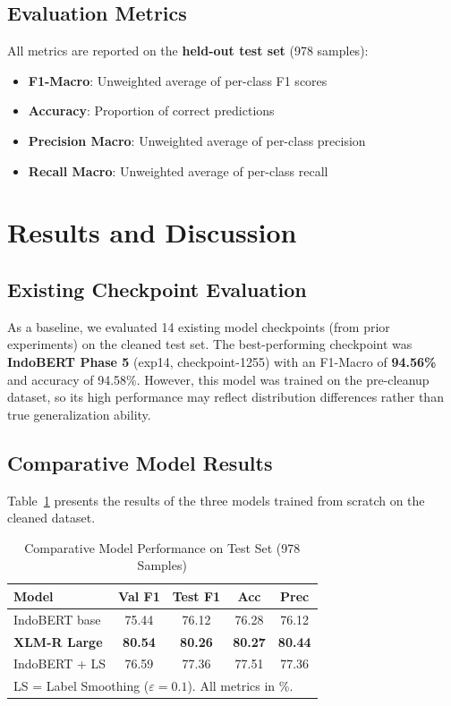 \documentclass[10pt,twocolumn]{article}
\begin{document}
\subsection{Evaluation Metrics}

All metrics are reported on the \textbf{held-out test set} (978 samples):
\begin{itemize}[leftmargin=*,nosep]
    \item \textbf{F1-Macro}: Unweighted average of per-class F1 scores
    \item \textbf{Accuracy}: Proportion of correct predictions
    \item \textbf{Precision Macro}: Unweighted average of per-class precision
    \item \textbf{Recall Macro}: Unweighted average of per-class recall
\end{itemize}

\section{Results and Discussion}

\subsection{Existing Checkpoint Evaluation}

As a baseline, we evaluated 14 existing model checkpoints (from prior experiments) on the cleaned test set. The best-performing checkpoint was \textbf{IndoBERT Phase 5} (exp14, checkpoint-1255) with an F1-Macro of \textbf{94.56\%} and accuracy of 94.58\%. However, this model was trained on the pre-cleanup dataset, so its high performance may reflect distribution differences rather than true generalization ability.

\subsection{Comparative Model Results}

Table~\ref{tab:model_comparison} presents the results of the three models trained from scratch on the cleaned dataset.

\begin{table}[H]
\centering
\caption{Comparative Model Performance on Test Set (978 Samples)}
\label{tab:model_comparison}
\begin{tabular}{lcccc}
\toprule
\textbf{Model} & \textbf{Val F1} & \textbf{Test F1} & \textbf{Acc} & \textbf{Prec} \\
\midrule
IndoBERT base & 75.44 & 76.12 & 76.28 & 76.12 \\
\textbf{XLM-R Large} & \textbf{80.54} & \textbf{80.26} & \textbf{80.27} & \textbf{80.44} \\
IndoBERT + LS & 76.59 & 77.36 & 77.51 & 77.36 \\
\bottomrule
\multicolumn{5}{l}{\footnotesize LS = Label Smoothing ($\varepsilon=0.1$). All metrics in \%.} \\
\end{tabular}
\end{table}
\end{document}
